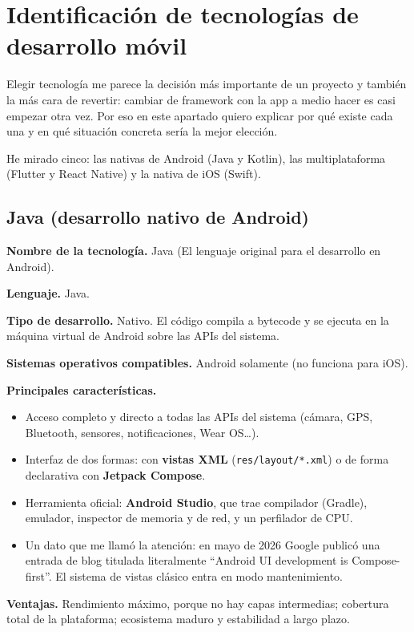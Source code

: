 \documentclass[11pt,a4paper]{article}
\newcommand{\code}[1]{\texttt{\color{navylight}#1}}
\newcommand{\campo}[1]{\textbf{\color{navy}#1}}
\begin{document}
	\section{Identificación de tecnologías de desarrollo móvil}
	
	Elegir tecnología me parece la decisión más importante de un proyecto y también la más cara de revertir: cambiar de framework con la app a medio hacer es casi empezar otra vez. Por eso en este apartado quiero explicar por qué existe cada una y en qué situación concreta sería la mejor elección.
	
	He mirado cinco: las nativas de Android (Java y Kotlin), las multiplataforma (Flutter y React Native) y la nativa de iOS (Swift).
	
	\subsection{Java (desarrollo nativo de Android)}
	
  \campo{Nombre de la tecnología.} Java (El lenguaje original para el desarrollo en Android).
	
	\campo{Lenguaje.} Java.
	
	\campo{Tipo de desarrollo.} Nativo. El código compila a bytecode y se ejecuta en la máquina virtual de Android sobre las APIs del sistema.
	
	\campo{Sistemas operativos compatibles.} Android solamente (no funciona para iOS).
	
	\campo{Principales características.}
	\begin{itemize}[leftmargin=*,itemsep=0.2em,topsep=0.2em]
		\item Acceso completo y directo a todas las APIs del sistema (cámara, GPS, Bluetooth, sensores, notificaciones, Wear OS\ldots).
		\item Interfaz de dos formas: con \textbf{vistas XML} (\code{res/layout/*.xml}) o de forma declarativa con \textbf{Jetpack Compose}.
		\item Herramienta oficial: \textbf{Android Studio}, que trae compilador (Gradle), emulador, inspector de memoria y de red, y un perfilador de CPU.
		\item Un dato que me llamó la atención: en mayo de 2026 Google publicó una entrada de blog titulada literalmente \enquote{Android UI development is Compose-first}. El sistema de vistas clásico entra en modo mantenimiento.
	\end{itemize}
	
	\campo{Ventajas.} Rendimiento máximo, porque no hay capas intermedias; cobertura total de la plataforma; ecosistema maduro y estabilidad a largo plazo.
	
\end{document}
